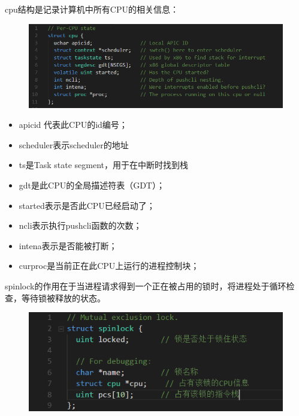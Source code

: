 \documentclass[a4paper,12pt]{report}
\begin{document}
cpu结构是记录计算机中所有CPU的相关信息：

\begin{figure}[H]
	\centering
	\includegraphics [width=1.0\textwidth]{figure//image100.png}
\end{figure}

\begin{itemize}
  \item 	apicid 代表此CPU的id编号；
  \item 	scheduler表示scheduler的地址
  \item 	ts是Task state segment，用于在中断时找到栈
  \item 	gdt是此CPU的全局描述符表（GDT）；
  \item 	started表示是否此CPU已经启动了；
  \item 	ncli表示执行pushcli函数的次数；
  \item 	intena表示是否能被打断；
  \item curproc是当前正在此CPU上运行的进程控制块；
\end{itemize}
spinlock的作用在于当进程请求得到一个正在被占用的锁时，将进程处于循环检查，等待锁被释放的状态。
\begin{figure}[H]
	\centering
	\includegraphics [width=1.0\textwidth]{figure//image101.png}
\end{figure}
\end{document}
